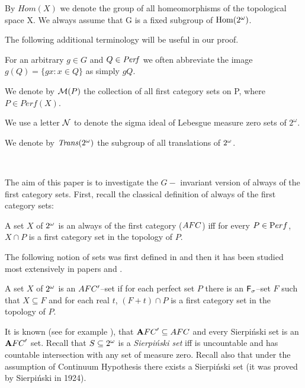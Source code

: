   By $Hom(X)$ we denote the group of all homeomorphisms of the
topological space X.
  We always assume that G is a fixed subgroup of ${\rm Hom(2^{\omega})}$.

The following additional terminology will be useful in our proof.

  For an arbitrary $g\in G$ and $Q \in {\it Perf}$
we often abbreviate the image $g(Q) = \lbrace gx: x\in Q \rbrace$
as simply $gQ$.

  We denote by ${\cal M}(P)$ the collection of all
first category sets on P, where $P \in Perf(X)$.

  We use a letter ${\cal N}$ to denote
the sigma ideal of Lebesgue measure zero sets of $2^\omega$.

  We denote by ${\it Trans}(2^{\omega})$ the subgroup of all
translations of $2^{\omega}$. 

\bigskip
{} \\
\bigskip

The aim of this paper is to investigate the $G-$ invariant
version of always of the first category sets.
First, recall the classical definition of always of the first category sets:
\begin{definition}
A set $X$ of $2^{\omega}$ is an always of the first category ($AFC$) 
iff for every $P\in {\mathrm Perf}$, $X\cap P$ is a first category set
in the topology of $P$.
\end{definition}

The following notion of sets was first defined in \cite{NSW}
and then it has been studied most extensively in
papers \cite{NW1} and \cite{NW2}.

\begin{definition}
  A set $X$ of $2^{\omega}$ is an $AFC'$--set if for each perfect
set $P$ there is an ${\sf F}_{\sigma}$--set $F$ such that $X\subseteq F$
and for each real $t$, $(F + t)\cap P$ is a first
category set in the topology of $P$.
\end{definition}


It is known (see for example \cite{NSW}),
that ${\mathbf AFC}^\prime \subseteq AFC$ and every Sierpi\'nski set is an ${\mathbf AFC}^\prime$ set.
Recall that $S \subseteq 2^{\omega}$ is a {\it Sierpi\'nski set}
iff is uncountable and has countable intersection with
any set of measure zero. Recall also that under the assumption
of Continuum Hypothesis there exists a Sierpi\'nski set 
(it was proved by Sierpi\'nski in 1924).

